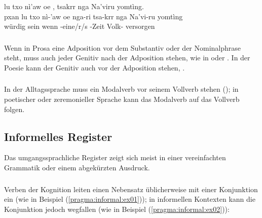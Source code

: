 \begin{interlin}
	\glll \Npawl{} lu txo nì'aw oe , tsakrr nga Na'viru yomtìng. \\
	pxan lu txo nì-'aw oe nga-ri tsa-krr nga Na'vi-ru yomtìng \\
	würdig sein wenn -eine/r/s   -Zeit  Volk- versorgen \\
\end{interlin}

\subsubsection{} Wenn in Prosa eine Adposition vor dem Substantiv oder der Nominalphrase steht, muss auch jeder Genitiv nach der Adposition stehen, wie in  oder  . In der Poesie kann der Genitiv auch vor der Adposition stehen, .\\

\subsubsection{} In der Alltagssprache muss ein Modalverb vor seinem Vollverb stehen (); in poetischer oder zeremonieller Sprache kann das Modalverb auf das Vollverb folgen.

\subsection{Informelles Register} Das umgangssprachliche Register zeigt sich meist in einer vereinfachten Grammatik oder einem abgekürzten Ausdruck.

\subsubsection{} Verben der Kognition leiten einen Nebensatz üblicherweise mit einer Konjunktion ein (wie in Beispiel (\ref{pragma:informal:ex01})); in informellen Kontexten kann die Konjunktion jedoch wegfallen (wie in Beispiel (\ref{pragma:informal:ex02})):

